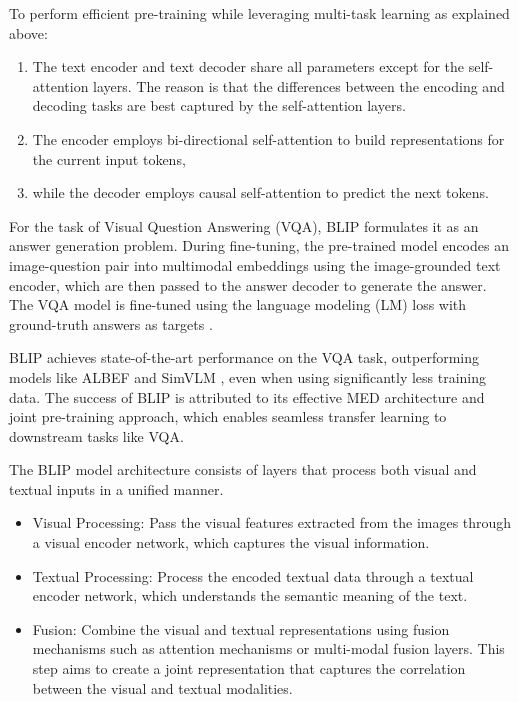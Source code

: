 \documentclass[pdflatex,sn-mathphys-num]{sn-jnl}%
\begin{document}
To perform efficient pre-training while leveraging multi-task learning as explained above:

\begin{enumerate}
\item The text encoder and text decoder share all parameters except for the self-attention layers. The reason is that the differences between the encoding and decoding tasks are best captured by the self-attention layers.
\item The encoder employs bi-directional self-attention to build representations for the current input tokens,
\item while the decoder employs causal self-attention to predict the next tokens.
\end{enumerate}

For the task of Visual Question Answering (VQA), BLIP formulates it as an answer generation problem. During fine-tuning, the pre-trained model encodes an image-question pair into multimodal embeddings using the image-grounded text encoder, which are then passed to the answer decoder to generate the answer. The VQA model is fine-tuned using the language modeling (LM) loss with ground-truth answers as targets \cite{li2022blip}.

BLIP achieves state-of-the-art performance on the VQA task, outperforming models like ALBEF \cite{li2021align} and SimVLM \cite{wang2022simvlm}, even when using significantly less training data. The success of BLIP is attributed to its effective MED architecture and joint pre-training approach, which enables seamless transfer learning to downstream tasks like VQA.

The BLIP model architecture consists of layers that process both visual and textual inputs in a unified manner.

\begin{itemize}
    \item Visual Processing: Pass the visual features extracted from the images through a visual encoder network, which captures the visual information.
    \item Textual Processing: Process the encoded textual data through a textual encoder network, which understands the semantic meaning of the text.
    \item Fusion: Combine the visual and textual representations using fusion mechanisms such as attention mechanisms or multi-modal fusion layers. This step aims to create a joint representation that captures the correlation between the visual and textual modalities.
\end{itemize}
\end{document}
